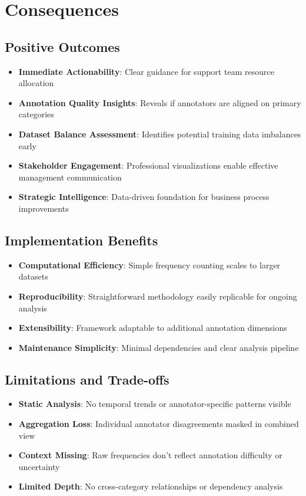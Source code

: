 \documentclass[11pt]{article}
\begin{document}
\section{Consequences}

\subsection{Positive Outcomes}
\begin{itemize}
\item \textbf{Immediate Actionability}: Clear guidance for support team resource allocation
\item \textbf{Annotation Quality Insights}: Reveals if annotators are aligned on primary categories
\item \textbf{Dataset Balance Assessment}: Identifies potential training data imbalances early
\item \textbf{Stakeholder Engagement}: Professional visualizations enable effective management communication
\item \textbf{Strategic Intelligence}: Data-driven foundation for business process improvements
\end{itemize}

\subsection{Implementation Benefits}
\begin{itemize}
\item \textbf{Computational Efficiency}: Simple frequency counting scales to larger datasets
\item \textbf{Reproducibility}: Straightforward methodology easily replicable for ongoing analysis
\item \textbf{Extensibility}: Framework adaptable to additional annotation dimensions
\item \textbf{Maintenance Simplicity}: Minimal dependencies and clear analysis pipeline
\end{itemize}

\subsection{Limitations and Trade-offs}
\begin{itemize}
\item \textbf{Static Analysis}: No temporal trends or annotator-specific patterns visible
\item \textbf{Aggregation Loss}: Individual annotator disagreements masked in combined view
\item \textbf{Context Missing}: Raw frequencies don't reflect annotation difficulty or uncertainty
\item \textbf{Limited Depth}: No cross-category relationships or dependency analysis
\end{itemize}
\end{document}
